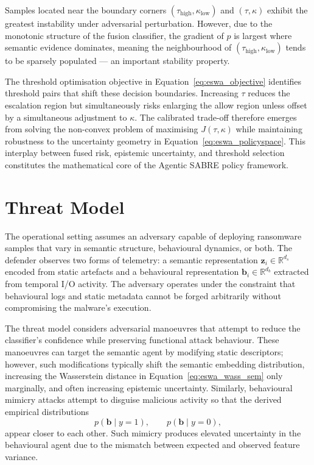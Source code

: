 Samples located near the boundary corners $(\tau_\text{high}, \kappa_\text{low})$ and $(\tau, \kappa)$ exhibit the greatest instability under adversarial perturbation. However, due to the monotonic structure of the fusion classifier, the gradient of $\hat{p}$ is largest where semantic evidence dominates, meaning the neighbourhood of $(\tau_\text{high}, \kappa_\text{low})$ tends to be sparsely populated — an important stability property.

The threshold optimisation objective in Equation~\eqref{eq:eswa_objective} identifies threshold pairs that shift these decision boundaries. Increasing $\tau$ reduces the escalation region but simultaneously risks enlarging the allow region unless offset by a simultaneous adjustment to $\kappa$. The calibrated trade-off therefore emerges from solving the non-convex problem of maximising $J(\tau,\kappa)$ while maintaining robustness to the uncertainty geometry in Equation~\eqref{eq:eswa_policyspace}. This interplay between fused risk, epistemic uncertainty, and threshold selection constitutes the mathematical core of the Agentic SABRE policy framework.


\section{Threat Model}
\label{sec:eswa_threatmodel}

The operational setting assumes an adversary capable of deploying ransomware samples that vary in semantic structure, behavioural dynamics, or both. The defender observes two forms of telemetry: a semantic representation $\mathbf{z}_i \in \mathbb{R}^{d_s}$ encoded from static artefacts and a behavioural representation $\mathbf{b}_i \in \mathbb{R}^{d_b}$ extracted from temporal I/O activity. The adversary operates under the constraint that behavioural logs and static metadata cannot be forged arbitrarily without compromising the malware's execution.

The threat model considers adversarial manoeuvres that attempt to reduce the classifier's confidence while preserving functional attack behaviour. These manoeuvres can target the semantic agent by modifying static descriptors; however, such modifications typically shift the semantic embedding distribution, increasing the Wasserstein distance in Equation~\eqref{eq:eswa_wass_sem} only marginally, and often increasing epistemic uncertainty. Similarly, behavioural mimicry attacks attempt to disguise malicious activity so that the derived empirical distributions
\begin{equation}
p(\mathbf{b} \mid y=1), \qquad p(\mathbf{b} \mid y=0),
\label{eq:eswa_beh_dists}
\end{equation}
appear closer to each other. Such mimicry produces elevated uncertainty in the behavioural agent due to the mismatch between expected and observed feature variance.

